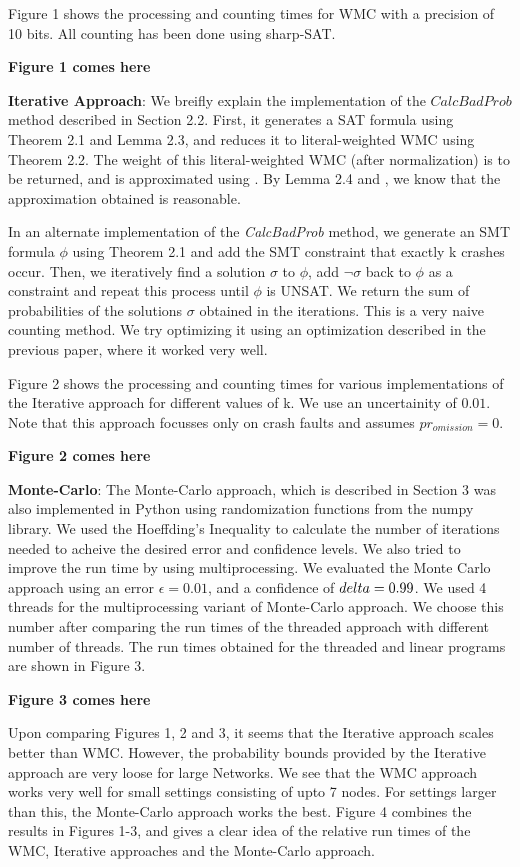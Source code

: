 \documentclass{sig-alternate-05-2015}[9pt]
\theoremstyle{definition}
\begin{document}
		Figure 1 shows the processing and counting times for WMC with a precision of 10 bits. All counting has been done using sharp-SAT.

		{\bf Figure 1 comes here}

		{\bf Iterative Approach}: 
		We breifly explain the implementation of the $CalcBadProb$ method described in Section 2.2. First, it generates a SAT formula using Theorem 2.1 and Lemma 2.3, and reduces it to literal-weighted WMC using Theorem 2.2. The weight of this literal-weighted WMC (after normalization) is to be returned, and is approximated using \cite{WeightGen}. By Lemma 2.4 and \cite{WeightGen}, we know that the approximation obtained is reasonable.

		In an alternate implementation of the {\em CalcBadProb} method, we generate an SMT formula $\phi$ using Theorem 2.1 and add the SMT constraint that exactly k crashes occur. Then, we iteratively find a solution $\sigma$ to $\phi$, add $\neg \sigma$ back to $\phi$ as a constraint and repeat this process until $\phi$ is UNSAT. We return the sum of probabilities of the solutions $\sigma$ obtained in the iterations. This is a very naive counting method. We try optimizing it using an optimization described in the previous paper, where it worked very well.

		Figure 2 shows the processing and counting times for various implementations of the Iterative approach for different values of k. We use an uncertainity of $0.01$. Note that this approach focusses only on crash faults and assumes $pr_{omission}=0$.

		{\bf Figure 2 comes here}

		{\bf Monte-Carlo}: 
		The Monte-Carlo approach, which is described in Section 3 was also implemented in Python using randomization functions from the numpy \cite{numpy} library. We used the Hoeffding's Inequality \cite{hoeffding} to calculate the number of iterations needed to acheive the desired error and confidence levels. We also tried to improve the run time by using multiprocessing. We evaluated the Monte Carlo approach using an error $\epsilon=0.01$, and a confidence of $\\delta=0.99$. We used 4 threads for the multiprocessing variant of Monte-Carlo approach. We choose this number after comparing the run times of the threaded approach  with different number of threads. The run times obtained for the threaded and linear programs are shown in Figure 3.

		{\bf Figure 3 comes here}

		Upon comparing Figures 1, 2 and 3, it seems that the Iterative approach scales better than WMC. However, the probability bounds provided by the Iterative approach are very loose for large Networks. We see that the WMC approach works very well for small settings consisting of upto 7 nodes. For settings larger than this, the Monte-Carlo approach works the best. Figure 4 combines the results in Figures 1-3, and gives a clear idea of the relative run times of the WMC, Iterative approaches and the Monte-Carlo approach. 

\end{document}

